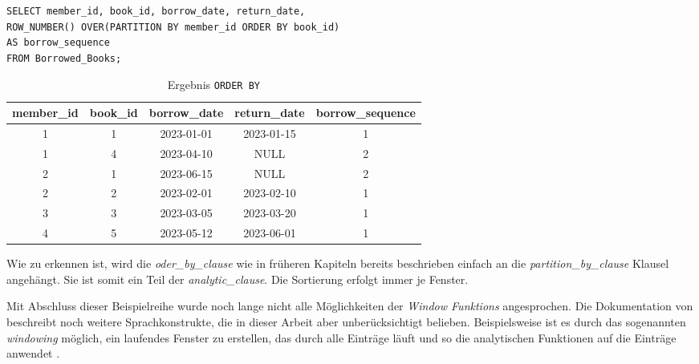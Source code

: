 \begin{lstlisting}[label={list:window-function-order-by}]
SELECT member_id, book_id, borrow_date, return_date,
ROW_NUMBER() OVER(PARTITION BY member_id ORDER BY book_id)
AS borrow_sequence
FROM Borrowed_Books;
\end{lstlisting}
\begin{table}[h]
	\centering
	\begin{tabular}{|c|c|c|c|c|}
		\hline
		\textbf{member\_id} & \textbf{book\_id} & \textbf{borrow\_date} & \textbf{return\_date} & \textbf{borrow\_sequence} \\
		\hline
		1                   & 1                 & 2023-01-01            & 2023-01-15            & 1                         \\
		\hline
		1                   & 4                 & 2023-04-10            & NULL                  & 2                         \\
		\hline
		2                   & 1                 & 2023-06-15            & NULL                  & 2                         \\
		\hline
		2                   & 2                 & 2023-02-01            & 2023-02-10            & 1                         \\
		\hline
		3                   & 3                 & 2023-03-05            & 2023-03-20            & 1                         \\
		\hline
		4                   & 5                 & 2023-05-12            & 2023-06-01            & 1                         \\
		\hline
	\end{tabular}
	\caption{Ergebnis \texttt{ORDER BY}}
	\label{tab:ergebnis_oder_by}
\end{table}

Wie zu erkennen ist, wird die \textit{oder\_by\_clause} wie in früheren Kapiteln
bereits beschrieben einfach an die \textit{partition\_by\_clause} Klausel
angehängt. Sie ist somit ein Teil der \textit{analytic\_clause}. Die Sortierung erfolgt
immer je Fenster.

Mit Abschluss dieser Beispielreihe wurde noch lange nicht alle Möglichkeiten der
\textit{Window Funktions} angesprochen. Die Dokumentation von \citet{oracle}
beschreibt noch weitere Sprachkonstrukte, die in dieser Arbeit aber unberücksichtigt
belieben. Beispielsweise ist es durch das sogenannten \textit{windowing} möglich,
ein laufendes Fenster zu erstellen, das durch alle Einträge läuft und so die analytischen
Funktionen auf die Einträge anwendet \citep[vgl.][]{oracle}.

